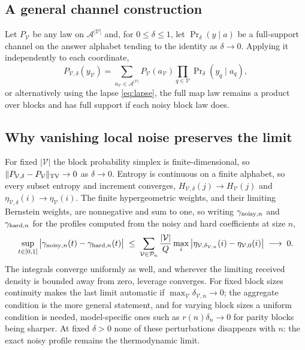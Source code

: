 \subsection{A general channel construction}

Let $P_{\mathcal V}$ be any law on
$\mathcal A^{|\mathcal V|}$ and, for $0\le\delta\le1$, let
$\Pr_\delta(y\mid a)$ be a full-support channel on the answer
alphabet tending to the identity as $\delta\to0$. Applying it
independently to each coordinate,
%
\begin{equation}
  P_{\mathcal V,\delta}(y_{\mathcal V})
  = \sum_{a_{\mathcal V}\in\mathcal A^{|\mathcal V|}}
  P_{\mathcal V}(a_{\mathcal V})
  \prod_{q\in\mathcal V}\Pr\nolimits_\delta(y_q\mid a_q),
  \label{eq:appchannel}
\end{equation}
%
or alternatively using the lapse \eqref{eq:lapse}, the full map law
remains a product over blocks and has full support if each noisy
block law does.

\subsection{Why vanishing local noise preserves the limit}

For fixed $|\mathcal V|$ the block probability simplex is
finite-dimensional, so
$\|P_{\mathcal V,\delta}-P_{\mathcal V}\|_{\rm TV}\to0$ as
$\delta\to0$. Entropy is continuous on a finite alphabet, so every
subset entropy and increment converges,
$H_{\mathcal V,\delta}(j)\to H_{\mathcal V}(j)$ and
$\eta_{\mathcal V,\delta}(i)\to\eta_{\mathcal V}(i)$. The finite
hypergeometric weights, and their limiting Bernstein weights, are
nonnegative and sum to one, so writing $\gamma_{{\rm noisy},n}$ and
$\gamma_{{\rm hard},n}$ for the profiles computed from the noisy and
hard coefficients at size $n$,
%
\begin{equation}
  \sup_{t\in[0,1]}
  \big|\gamma_{{\rm noisy},n}(t)-\gamma_{{\rm hard},n}(t)\big|
  \;\le\;
  \sum_{\mathcal V\in\mathcal P_n}\frac{|\mathcal V|}{Q}
  \max_i\big|\eta_{\mathcal V,\delta_{\mathcal V,n}}(i)
  -\eta_{\mathcal V,0}(i)\big|
  \;\longrightarrow\;0 .
  \label{eq:appnoisebound}
\end{equation}
%
The integrals converge uniformly as well, and wherever the limiting
received density is bounded away from zero, leverage converges. For
fixed block sizes continuity makes the last limit automatic if
$\max_{\mathcal V}\delta_{\mathcal V,n}\to0$; the aggregate condition
is the more general statement, and for varying block sizes a uniform
condition is needed, model-specific ones such as $r(n)\delta_n\to0$
for parity blocks being sharper. At fixed $\delta>0$ none of these
perturbations disappears with $n$: the exact noisy profile remains the
thermodynamic limit.

